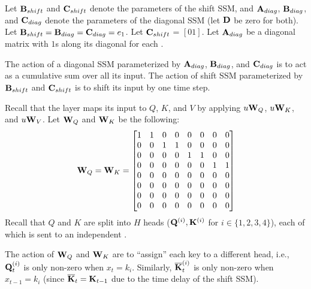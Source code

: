 Let $\mathbf{B}_{shift}$ and $\mathbf{C}_{shift}$ denote the parameters of the shift SSM, and $\mathbf{A}_{diag}$, $\mathbf{B}_{diag}$, and $\mathbf{C}_{diag}$ denote the parameters of the diagonal SSM (let $\mathbf{D}$ be zero for both).
Let $\mathbf{B}_{shift} = \mathbf{B}_{diag} = \mathbf{C}_{diag} = e_1$.
Let $\mathbf{C}_{shift}$ = $[0 1]$.
Let $\mathbf{A}_{diag}$ be a diagonal matrix with $1$s along its diagonal for each \hthree.

\begin{remark}
The action of a diagonal SSM parameterized by $\mathbf{A}_{diag}$, $\mathbf{B}_{diag}$, and $\mathbf{C}_{diag}$ is to act as a cumulative sum over all its input.
The action of shift SSM parameterized by $\mathbf{B}_{shift}$ and $\mathbf{C}_{shift}$ is to shift its input by one time step.
\end{remark}

Recall that the \hthree layer maps its input to $Q$, $K$, and $V$ by applying $u\mathbf{W}_Q$, $u\mathbf{W}_K$, and $u\mathbf{W}_V$.
Let $\mathbf{W}_Q$ and $\mathbf{W}_K$ be the following:
$$
    \mathbf{W}_Q = \mathbf{W}_K = \begin{bmatrix}
        1 & 1 & 0 & 0 & 0 & 0 & 0 & 0 \\
        0 & 0 & 1 & 1 & 0 & 0 & 0 & 0 \\
        0 & 0 & 0 & 0 & 1 & 1 & 0 & 0 \\
        0 & 0 & 0 & 0 & 0 & 0 & 1 & 1 \\
        0 & 0 & 0 & 0 & 0 & 0 & 0 & 0 \\
        0 & 0 & 0 & 0 & 0 & 0 & 0 & 0 \\
        0 & 0 & 0 & 0 & 0 & 0 & 0 & 0 \\
        0 & 0 & 0 & 0 & 0 & 0 & 0 & 0 \\
    \end{bmatrix}
$$
Recall that $Q$ and $K$ are split into $H$ heads ($\mathbf{Q}^{(i)}, \mathbf{K}^{(i)}$ for $i \in \{1, 2, 3, 4\}$), each of which is sent to an independent \hthree.

\begin{remark}
The action of $\mathbf{W}_Q$ and $\mathbf{W}_K$ are to ``assign'' each key to a different \hthree head, i.e., $\mathbf{Q}^{(i)}_t$ is only non-zero when $x_t = k_i$.
Similarly, $\overline{\mathbf{K}}^{(i)}_t$ is only non-zero when $x_{t-1} = k_i$ (since $\overline{\mathbf{K}}_t = \mathbf{K}_{t-1}$ due to the time delay of the shift SSM).
\end{remark}

